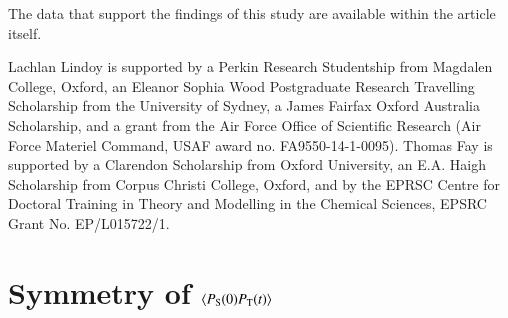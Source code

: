 \documentclass[%
aip,
jcp,%
amsmath,amssymb,
reprint%
]{revtex4-1}
\newcommand{\sing}{\ensuremath{\mathrm{S}}}
\newcommand{\trip}{\ensuremath{\mathrm{T}}}
\begin{document}
The data that support the findings of this study are available within the article itself.

\acknowledgements

Lachlan Lindoy is supported by a Perkin Research Studentship from Magdalen College, Oxford, an Eleanor Sophia Wood Postgraduate Research Travelling Scholarship from the University of Sydney, a James Fairfax Oxford Australia Scholarship, and a grant from the Air Force Office of Scientific Research (Air Force Materiel Command, USAF award no. FA9550-14-1-0095). Thomas Fay is supported by a Clarendon Scholarship from Oxford University, an E.A. Haigh Scholarship from Corpus Christi College, Oxford, and by the EPRSC Centre for Doctoral Training in Theory and Modelling in the Chemical Sciences, EPSRC Grant No. EP/L015722/1. 

\appendix

\section{Symmetry of $\ev{P_\sing(0)P_\trip(t)}$}\label{corr-func-app}
\end{document}

